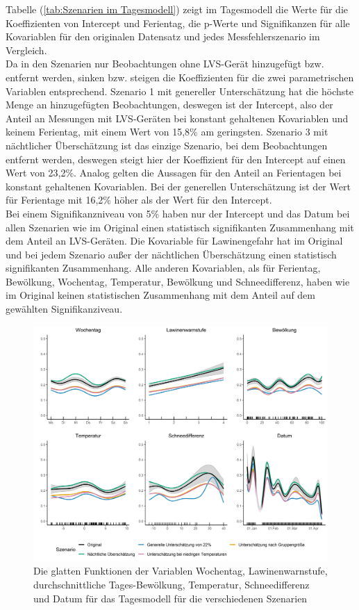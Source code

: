 \documentclass[12pt]{scrreprt}
\begin{document}
\noindent Tabelle (\ref{tab:Szenarien im Tagesmodell}) zeigt im Tagesmodell die Werte für die Koeffizienten von Intercept und Ferientag, die p-Werte und Signifikanzen für alle Kovariablen für den originalen Datensatz und jedes Messfehlerszenario im Vergleich. \\
Da in den Szenarien nur Beobachtungen ohne LVS-Gerät hinzugefügt bzw. entfernt werden, sinken bzw. steigen die Koeffizienten für die zwei parametrischen Variablen entsprechend. Szenario 1 mit genereller Unterschätzung hat die höchste Menge an hinzugefügten Beobachtungen, deswegen ist der Intercept, also der Anteil an Messungen mit LVS-Geräten bei konstant gehaltenen Kovariablen und keinem Ferientag, mit einem Wert von 15,8\% am geringsten. Szenario 3 mit nächtlicher Überschätzung ist das einzige Szenario, bei dem Beobachtungen entfernt werden, deswegen steigt hier der Koeffizient für den Intercept auf einen Wert von 23,2\%. Analog gelten die Aussagen für den Anteil an Ferientagen bei konstant gehaltenen Kovariablen. Bei der generellen Unterschätzung ist der Wert für Ferientage mit 16,2\% höher als der Wert für den Intercept. \\
Bei einem Signifikanzniveau von 5\% haben nur der Intercept und das Datum bei allen Szenarien wie im Original einen statistisch signifikanten Zusammenhang mit dem Anteil an LVS-Geräten. Die Kovariable für Lawinengefahr hat im Original und bei jedem Szenario außer der nächtlichen Überschätzung einen statistisch signifikanten Zusammenhang. Alle anderen Kovariablen, als für Ferientag, Bewölkung, Wochentag, Temperatur, Bewölkung und Schneedifferenz, haben wie im Original keinen statistischen Zusammenhang mit dem Anteil auf dem gewählten Signifikanziveau. \\
\begin{figure}[H]
	\centering
	\includegraphics[width=\linewidth]{plots/day_model_comparison_plots}
	\caption{ Die glatten Funktionen der Variablen Wochentag, Lawinenwarnstufe, durchschnittliche Tages-Bewölkung, Temperatur, Schneedifferenz und Datum für das Tagesmodell für die verschiedenen Szenarien}
	\label{pic:day_model_comparison_plots}	
\end{figure}
\end{document}
